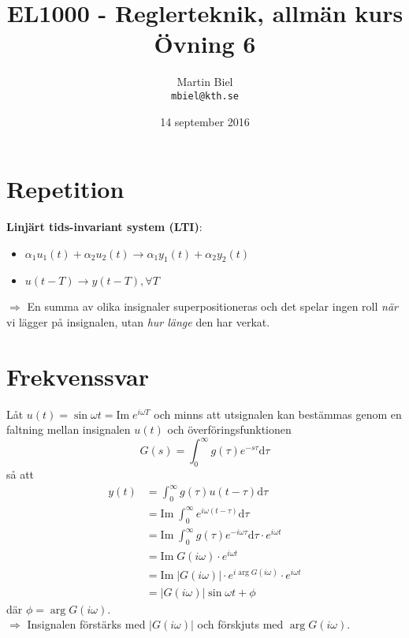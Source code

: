 \documentclass[12pt]{article}
\newcommand{\ima}[1]{\mathrm{Im}\; #1}
\newcommand{\de}[1]{\mathrm{d}#1}
\begin{document}
\begin{titlepage}
\author{Martin Biel \\ \texttt{mbiel@kth.se}}
\title{EL1000 - Reglerteknik, allmän kurs \\ \Large Övning 6}
\date{14 september 2016}
\end{titlepage}

\maketitle

\section*{Repetition}
\textbf{Linjärt tids-invariant system (LTI)}:
\begin{itemize}
\item $\alpha_1 u_1(t) + \alpha_2u_2(t) \rightarrow \alpha_1 y_1(t) + \alpha_2 y_2(t)$ 
\item $u(t-T) \rightarrow y(t-T), \forall T$
\end{itemize}
$\Rightarrow$ En summa av olika insignaler superpositioneras och det spelar ingen roll \emph{när} vi lägger på insignalen, utan \emph{hur länge} den har verkat. \\

\section*{Frekvenssvar}
Låt $u(t) = \sin{\omega t} = \ima{e^{i\omega T}}$ och minns att utsignalen kan bestämmas genom en faltning mellan insignalen $u(t)$ och överföringsfunktionen 
\[G(s) = \int_{0}^{\infty}g(\tau) e^{-s \tau} \de{\tau}
\]
så att
\begin{align*}
  y(t) &= \int_{0}^{\infty}g(\tau) u(t-\tau) \de{\tau} \\
       &= \ima{\int_{0}^{\infty}e^{i\omega(t-\tau)}\de{\tau}} \\
       &= \ima{\int_{0}^{\infty}g(\tau)e^{-i\omega \tau}\de{\tau} \cdot e^{i\omega t}} \\
       &= \ima{G(i\omega) \cdot e^{i\omega t}} \\
       &= \ima{|G(i\omega)| \cdot e^{i\arg{G(i\omega)}} \cdot e^{i\omega t}} \\
       &= |G(i\omega)| \sin{\omega t + \phi}
\end{align*}
där $\phi = \arg{G(i\omega)}$. \\
$\Rightarrow$ Insignalen förstärks med $|G(i\omega)|$ och förskjuts med $\arg{G(i\omega)}$. \\
\end{document}
